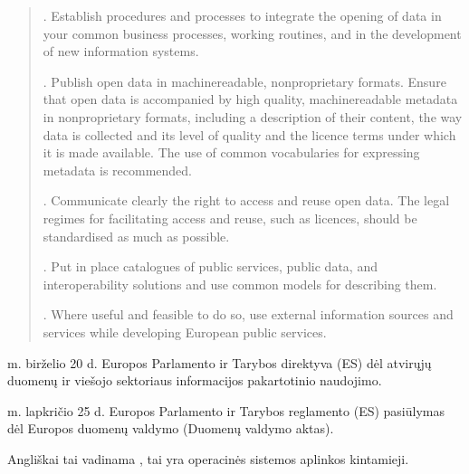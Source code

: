 \documentclass[letterpaper,10pt,lithuanian]{sphinxmanual}
\begin{document}
\begin{description}
\begin{quote}
. Establish procedures and processes to integrate the opening of
data in your common business processes, working routines, and in the
development of new information systems.

. Publish open data in machine\sphinxhyphen{}readable, non\sphinxhyphen{}proprietary formats.
Ensure that open data is accompanied by high quality,
machine\sphinxhyphen{}readable metadata in non\sphinxhyphen{}proprietary formats, including a
description of their content, the way data is collected and its
level of quality and the licence terms under which it is made
available. The use of common vocabularies for expressing metadata is
recommended.

. Communicate clearly the right to access and reuse open data. The
legal regimes for facilitating access and reuse, such as licences,
should be standardised as much as possible.

. Put in place catalogues of public services, public data, and
interoperability solutions and use common models for describing
them.

. Where useful and feasible to do so, use external information
sources and services while developing European public services.
\end{quote}

 m. birželio 20 d. Europos Parlamento ir Tarybos direktyva (ES)
 dėl atvirųjų duomenų ir viešojo sektoriaus informacijos
pakartotinio naudojimo.

 m. lapkričio 25 d. Europos Parlamento ir Tarybos reglamento (ES)
pasiūlymas  dėl Europos duomenų valdymo (Duomenų valdymo
aktas).

\sphinxAtStartPar
Angliškai tai vadinama , tai yra operacinės
sistemos aplinkos kintamieji.


\end{description}
\end{document}
